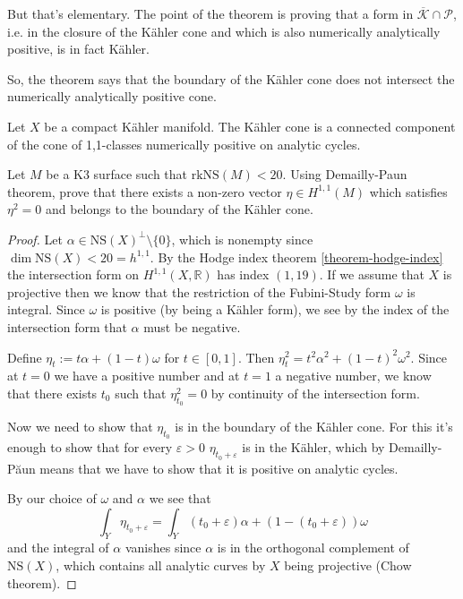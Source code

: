 \documentclass{book}
\begin{document}
But that's elementary.
The point of the theorem is proving that
a form in $\overline{\mathcal{K}}\cap
\mathcal{P}$,
i.e. in the closure of the Kähler cone
and which is also numerically analytically
positive,
is in fact Kähler.

So, the theorem says that the boundary of the
Kähler cone does
not intersect the numerically analytically
positive cone.

\begin{theorem}[Demailly-Pa\u un]
\label{theorem-demailly-paun}
Let $X$ be a compact Kähler manifold.
The Kähler cone is a connected component
of the cone of 1,1-classes numerically
positive on
analytic cycles.
\end{theorem}

\begin{exercise}
\label{exercise-demailly-paun}
Let $M$ be a K3 surface such that
$\text{rk}\text{NS}(M)<20$.
Using Demailly-Paun theorem,
prove that there exists a non-zero vector
$\eta \in H^{1,1}(M)$ which satisfies
$\eta^2=0$
and belongs to the boundary of the Kähler
cone.
\end{exercise}

\begin{proof}
Let $\alpha \in
\text{NS}(X)^{\perp}\setminus\{0\}$,
which is nonempty since $\dim
\text{NS}(X)<20=h^{1,1}$.
By the Hodge index theorem
\ref{theorem-hodge-index}
the intersection form on
$H^{1,1}(X,\mathbb{R})$
has index $(1,19)$.
If we assume that $X$ is projective
then we know that the restriction of
the Fubini-Study form $\omega$ is integral.
Since $\omega$ is positive (by being a Kähler
form),
we see by the index of the intersection form
that $\alpha$ must be negative.

Define $\eta_t:=t\alpha+(1-t)\omega$ for
$t\in[0,1]$.
Then $\eta_t^2=t^2\alpha^2+(1-t)^2\omega^2$.
Since at $t=0$ we have a positive number
and at  $t=1$ a negative number,
we know that there exists  $t_0$
such that $\eta_{t_0}^2=0$
by continuity of the intersection form.

Now we need to show that $\eta_{t_0}$ is
in the boundary of the Kähler cone.
For this it's enough to show that for every
$\varepsilon>0$
$\eta_{t_0+\varepsilon}$ is in the Kähler,
which
by Demailly-P\u aun
means that we have to show
that it is positive on analytic cycles.

By our choice of $\omega$ and $\alpha$
we see that
$$
\int_Y \eta_{t_0+\varepsilon}
=\int_Y
(t_0+\varepsilon)\alpha+(1-(t_0+\varepsilon))
\omega
$$
and the integral of $\alpha$ vanishes
since $\alpha$ is in the orthogonal
complement
of $\text{NS}(X)$, which contains
all analytic curves by $X$ being projective
(Chow theorem).
\end{proof}
\end{document}
